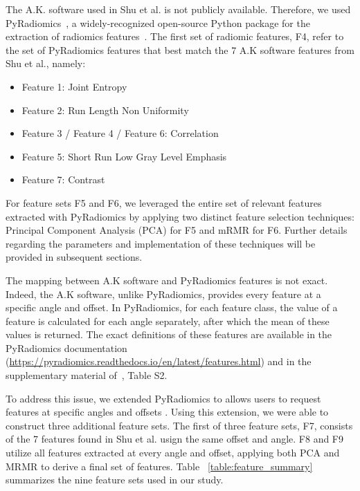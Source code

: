 The A.K. software used in Shu et al. is not publicly available. Therefore, we used PyRadiomics~\cite{pyradiomics_2017}, a widely-recognized open-source Python package for the extraction of radiomics features~\cite{Zwanenburg_2020}.
The first set of radiomic features, F4, refer to the set of PyRadiomics features that best match the 7 A.K software features from Shu et al., namely:

\begin{itemize}
    \item Feature 1: Joint Entropy
    \item Feature 2: Run Length Non Uniformity
    \item Feature 3 / Feature 4 / Feature 6: Correlation
    \item Feature 5: Short Run Low Gray Level Emphasis
    \item Feature 7: Contrast
\end{itemize}

For feature sets F5 and F6, we leveraged the entire set of relevant features extracted with PyRadiomics by applying two distinct feature selection techniques: Principal Component Analysis (PCA) for F5 and mRMR for F6. Further details regarding the parameters and implementation of these techniques will be provided in subsequent sections.

The mapping between A.K software and PyRadiomics features is not exact. Indeed, the A.K software, unlike PyRadiomics, provides every feature at a specific angle and offset. In PyRadiomics, for each feature class, the value of a feature is calculated for each angle separately, after which the mean of these values is returned. The exact definitions of these features are available in the PyRadiomics documentation (\url{https://pyradiomics.readthedocs.io/en/latest/features.html}) and in the supplementary material of~\cite{shu2021predicting}, Table S2. 

To address this issue, we extended PyRadiomics to allows users to request features at specific angles and offsets . Using this extension, we were able to construct three additional feature sets. The first of three feature sets, F7, consists of the 7 features found in Shu et al. usign the same offset and angle. F8 and F9 utilize all features extracted at every angle and offset, applying both PCA and MRMR to derive a final set of features. Table ~\ref{table:feature_summary} summarizes the nine feature sets used in our study.

